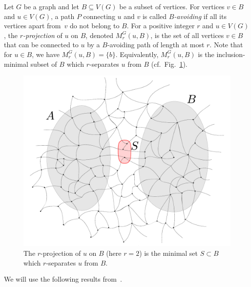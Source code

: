 Let $G$ be a graph and let $B\subseteq V(G)$ be a subset of vertices. For vertices $v\in B$ and $u\in V(G)$, a path $P$ connecting $u$ and $v$ is called {\em{$B$-avoiding}}
if all its vertices apart from~$v$ do not belong to $B$. For a positive integer $r$ and $u\in V(G)$, the {\em{$r$-projection}} of $u$ on $B$, denoted $M^G_r(u,B)$, is the set of all vertices $v\in B$ that
can be connected to $u$ by a $B$-avoiding path of length at most $r$. Note that for $u\in B$, we have $M^G_r(u,B)=\{b\}$.
Equivalently, $M^G_r(u,B)$ is the inclusion-minimal
subset of $B$ which $r$-separates $u$ from $B$ (cf.~Fig.~\ref{fig:projection}).

%
%
\begin{figure}[h!]
	\centering
		\includegraphics[scale=0.35,page=2]{pics}
	\caption{The  $r$-projection of $u$ on $B$
	(here $r=2$)
	is the minimal set  $S\subset B$
	which $r$-separates $ u$ from $B$.
	}
	\label{fig:projection}
\end{figure}

We will use the following results from~\cite{drange2016kernelization,eickmeyer2016neighborhood}.

